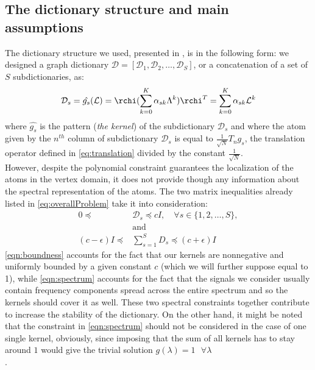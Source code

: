 \subsection{The dictionary structure and main assumptions}
The dictionary structure we used, presented in \cite{Thanou2014}, is in the following form: we designed a graph dictionary $\mathcal{D} = [\mathcal{D}_1, \mathcal{D}_2,\dots,\mathcal{D}_S]$, or a concatenation of a set of $S$ subdictionaries, as:
\begin{equation}
  \mathcal{D}_s = \hat{g_s}(\mathcal{L}) = \rchi (\sum_{k=0}^K \alpha_{sk}\Lambda^k)\rchi^T =   \sum_{k=0}^{K} \alpha_{sk}\mathcal{L}^k
\end{equation}
where $\hat{g_s}$ is the pattern (\textit{the kernel}) of the subdictionary $\mathcal{D}_s$ and where the atom given by the $n^{th}$ column of subdictionary $\mathcal{D}_s$ is equal to $\frac{1}{\sqrt{N}}T_ng_s$, the translation operator defined in \autoref{eq:translation} divided by the constant $\frac{1}{\sqrt{N}}$.\\
However, despite the polynomial constraint guarantees the localization of the atoms in the vertex domain, it does not provide though any information about the spectral representation of the atoms. The two matrix inequalities already listed in \autoref{eq:overallProblem} take it into consideration:
\begin{align}
  0 \preceq \text{ } &\mathcal{D}_s \preceq cI, \quad \forall s \in \{1,2,\dots , S\},  \label{eqn:boundness}\\
  &\text{and}\\
  (c-\epsilon)I \preceq &\sum_{s=1}^{S}D_s \preceq (c+\epsilon)I \label{eqn:spectrum}
\end{align}
\autoref{eqn:boundness} accounts for the fact that our kernels are nonnegative and uniformly bounded by a given constant $c$ (which we will further suppose equal to 1), while \autoref{eqn:spectrum} accounts for the fact that the signals we consider usually contain frequency components spread across the entire spectrum and so the kernels should cover it as well. These two spectral constraints together contribute to increase the stability of the dictionary. On the other hand, it might be noted that the constraint in \autoref{eqn:spectrum}  should not be considered in the case of one single kernel, obviously, since imposing that the sum of all kernels has to stay around $1$ would give the trivial solution $g(\lambda) = 1 \text{  } \forall \lambda$\\.

